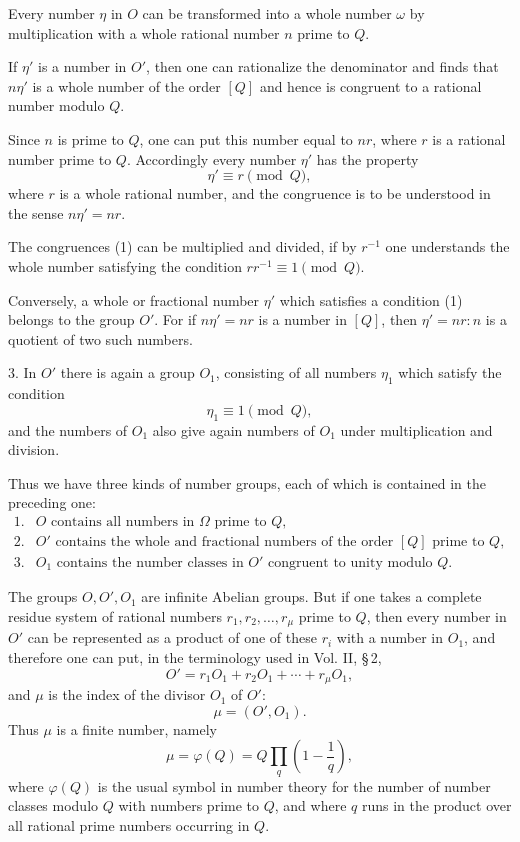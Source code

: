 \documentclass[11pt]{article}
\begin{document}
Every number $\eta$ in $O$ can be transformed into a whole number $\omega$ by multiplication with a whole rational number $n$ prime to $Q$.

If $\eta'$ is a number in $O'$, then one can rationalize the denominator and finds that $n\eta'$ is a whole number of the order $[Q]$ and hence is congruent to a rational number modulo $Q$.

Since $n$ is prime to $Q$, one can put this number equal to $nr$, where $r$ is a rational number prime to $Q$. Accordingly every number $\eta'$ has the property
\begin{equation}
 \eta'\equiv r\pmod Q,
\tag{1}
\end{equation}
where $r$ is a whole rational number, and the congruence is to be understood in the sense $n\eta'=nr$.

The congruences (1) can be multiplied and divided, if by $r^{-1}$ one understands the whole number satisfying the condition $rr^{-1}\equiv1\pmod Q$.

Conversely, a whole or fractional number $\eta'$ which satisfies a condition (1) belongs to the group $O'$. For if $n\eta'=nr$ is a number in $[Q]$, then $\eta'=nr:n$ is a quotient of two such numbers.

3. In $O'$ there is again a group $O_1$, consisting of all numbers $\eta_1$ which satisfy the condition
\begin{equation}
 \eta_1\equiv1\pmod Q,
\tag{2}
\end{equation}
and the numbers of $O_1$ also give again numbers of $O_1$ under multiplication and division.

Thus we have three kinds of number groups, each of which is contained in the preceding one:
\[
\begin{array}{ll}
1.& O \text{ contains all numbers in }\Omega\text{ prime to }Q,\\
2.& O' \text{ contains the whole and fractional numbers of the order }[Q]\text{ prime to }Q,\\
3.& O_1 \text{ contains the number classes in }O'\text{ congruent to unity modulo }Q.
\end{array}
\]

The groups $O,O',O_1$ are infinite Abelian groups. But if one takes a complete residue system of rational numbers $r_1,r_2,\ldots,r_\mu$ prime to $Q$, then every number in $O'$ can be represented as a product of one of these $r_i$ with a number in $O_1$, and therefore one can put, in the terminology used in Vol. II, \S\,2,
\begin{equation}
 O'=r_1O_1+r_2O_1+\cdots+r_\mu O_1,
\tag{3}
\end{equation}
and $\mu$ is the index of the divisor $O_1$ of $O'$:
\begin{equation}
 \mu=(O',O_1).
\tag{4}
\end{equation}
Thus $\mu$ is a finite number, namely
\begin{equation}
 \mu=\varphi(Q)=Q\prod_q\left(1-\frac1q\right),
\tag{5}
\end{equation}
where $\varphi(Q)$ is the usual symbol in number theory for the number of number classes modulo $Q$ with numbers prime to $Q$, and where $q$ runs in the product over all rational prime numbers occurring in $Q$.
\end{document}
